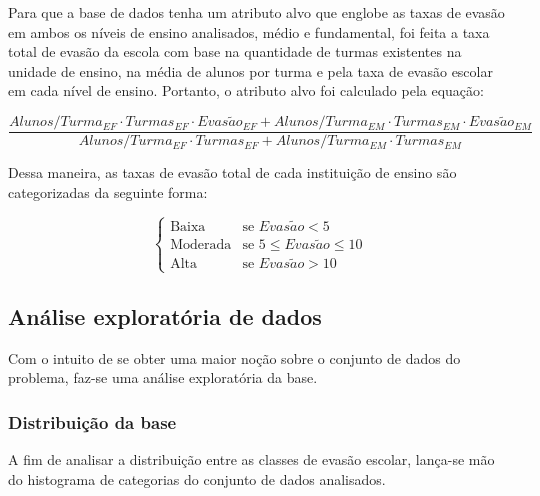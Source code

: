\par Para que a base de dados tenha um atributo alvo que englobe as taxas de evasão em ambos os níveis de ensino analisados, médio e fundamental, foi feita a taxa total de evasão da escola com base na quantidade de turmas existentes na unidade de ensino, na média de alunos por turma e pela taxa de evasão escolar em cada nível de ensino. Portanto, o atributo alvo foi calculado pela equação:

\begin{equation*}
    \frac{Alunos/Turma_{EF} \cdot Turmas_{EF} \cdot Evas\tilde{a}o_{EF} + Alunos/Turma_{EM} \cdot Turmas_{EM} \cdot Evas\tilde{a}o_{EM}}{Alunos/Turma_{EF} \cdot Turmas_{EF} + Alunos/Turma_{EM} \cdot Turmas_{EM}}
\end{equation*}

\par Dessa maneira, as taxas de evasão total de cada instituição de ensino são categorizadas da seguinte forma:

\[
\begin{cases} 
\text{Baixa} & \text{se } Evas\tilde{a}o < 5 \\
\text{Moderada} & \text{se } 5 \leq Evas\tilde{a}o \leq 10 \\
\text{Alta} & \text{se } Evas\tilde{a}o > 10 
\end{cases}
\]

\subsection{Análise exploratória de dados}

\par Com o intuito de se obter uma maior noção sobre o conjunto de dados do problema, faz-se uma análise exploratória da base.

\subsubsection{Distribuição da base}

\par A fim de analisar a distribuição entre as classes de evasão escolar, lança-se mão do histograma de categorias do conjunto de dados analisados.


